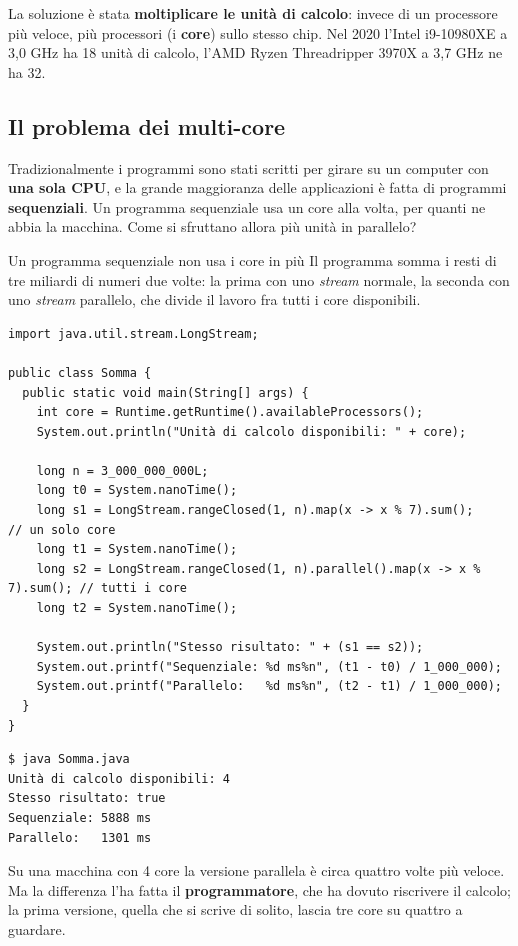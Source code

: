 La soluzione è stata \textbf{moltiplicare le unità di calcolo}: invece di un processore più veloce, più processori (i
\textbf{core}) sullo stesso chip. Nel 2020 l'Intel i9-10980XE a 3,0 GHz ha 18 unità di calcolo, l'AMD Ryzen Threadripper
3970X a 3,7 GHz ne ha 32.

\subsection{Il problema dei multi-core}

Tradizionalmente i programmi sono stati scritti per girare su un computer con \textbf{una sola CPU}, e la grande
maggioranza delle applicazioni è fatta di programmi \textbf{sequenziali}. Un programma sequenziale usa un core alla
volta, per quanti ne abbia la macchina. Come si sfruttano allora più unità in parallelo?

\begin{esempio}{Un programma sequenziale non usa i core in più}
Il programma somma i resti di tre miliardi di numeri due volte: la prima con uno \textit{stream} normale, la seconda con
uno \textit{stream} parallelo, che divide il lavoro fra tutti i core disponibili.

\begin{lstlisting}[style=java, name=Somma.java]
import java.util.stream.LongStream;

public class Somma {
  public static void main(String[] args) {
    int core = Runtime.getRuntime().availableProcessors();
    System.out.println("Unità di calcolo disponibili: " + core);

    long n = 3_000_000_000L;
    long t0 = System.nanoTime();
    long s1 = LongStream.rangeClosed(1, n).map(x -> x % 7).sum();            // un solo core
    long t1 = System.nanoTime();
    long s2 = LongStream.rangeClosed(1, n).parallel().map(x -> x % 7).sum(); // tutti i core
    long t2 = System.nanoTime();

    System.out.println("Stesso risultato: " + (s1 == s2));
    System.out.printf("Sequenziale: %d ms%n", (t1 - t0) / 1_000_000);
    System.out.printf("Parallelo:   %d ms%n", (t2 - t1) / 1_000_000);
  }
}
\end{lstlisting}

\begin{lstlisting}[style=shell, name=Terminale]
$ java Somma.java
Unità di calcolo disponibili: 4
Stesso risultato: true
Sequenziale: 5888 ms
Parallelo:   1301 ms
\end{lstlisting}
Su una macchina con 4 core la versione parallela è circa quattro volte più veloce. Ma la differenza l'ha fatta il
\textbf{programmatore}, che ha dovuto riscrivere il calcolo; la prima versione, quella che si scrive di solito, lascia tre
core su quattro a guardare.
\end{esempio}

